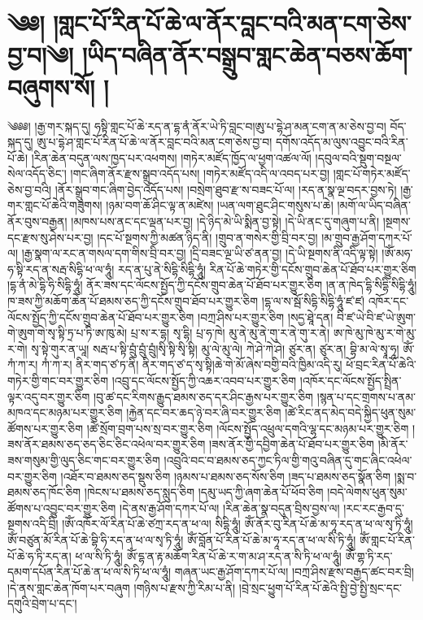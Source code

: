 \chapter{༄༅། །གླང་པོ་རིན་པོ་ཆེ་ལ་ནོར་བླང་བའི་མན་ངག་ཅེས་བྱ་བ།༄། །ཡིད་བཞིན་ནོར་བསྒྲུབ་གླང་ཆེན་བཅས་ཆོག་བཞུགས་སོ། །}༄༅༅། །རྒྱ་གར་སྐད་དུ། ཧསྟི་གླང་པོ་ཆེ་རད་ན་དྷ་ནཾ་ནོར་ཡེ་ཏི་བླང་བ།ཨུ་པ་དྷེ་ཤ་མན་ངག་ན་མ་ཅེས་བྱ་བ། བོད་སྐད་དུ། ཨུ་པ་དྷེ་ཤ་གླང་པོ་རིན་པོ་ཆེ་ལ་ནོར་བླང་བའི་མན་ངག་ཅེས་བྱ་བ། དགོས་འདོད་མ་ལུས་འབྱུང་བའི་རིན་པོ་ཆེ། །རིན་ཆེན་བདུན་ལས་ཁྱད་པར་འཕགས། །གཏེར་མཛོད་ཁྱོད་ལ་ཕྱག་འཚལ་ལོ། །དབུལ་བའི་སྡུག་བསྔལ་སེལ་འདོད་ཅིང་། །གང་ཞིག་ནོར་རྫས་སྒྲུབ་འདོད་པས། །གཏེར་མཛོད་འདི་ལ་འབད་པར་བྱ། །གླང་པོ་གཏེར་མཛོད་ཅེས་བྱ་བའི། །ནོར་སྒྲུབ་གང་ཞིག་བྱེད་འདོད་པས། །བསྲེག་ཐུབ་རྫ་ས་བཟང་པོ་ལ། །རད་ན་སྣ་ལྔ་བདར་བྱས་ཏེ། །རྒྱ་གར་གླང་པོ་ཆེའི་གཟུགས། །ཉམ་བག་ཆོ་ཤིང་ལྟ་ན་མཛེས། །ཡན་ལག་ཐུང་ཤིང་གསུས་པ་ཆེ། །མགོ་ལ་ཡིད་བཞིན་ནོར་བུས་བརྒྱན། །མཁས་པས་ནང་དང་ལྡན་པར་བྱ། །དེ་ཉིད་མེ་ཡི་སྨིན་བྱ་སྟེ། །དེ་ཡི་ནང་དུ་གཞུག་པ་ནི། །སྔགས་དང་རྫས་སུ་ཤེས་པར་བྱ། །དང་པོ་སྔགས་ཀྱི་མཚན་ཉིད་ནི། །གྲུབ་ན་གསེར་གྱི་བྲི་བར་བྱ། །མ་གྲུབ་རྒྱ་ཤོག་དཀར་པོ་ལ། །རྒྱ་སྣག་ལ་རང་ན་གསལ་དག་གིས་བྲི་བར་བྱ། །དྲི་བཟང་ལྔ་ཡི་ཙ་ནན་བྱ། །དེ་ཡི་སྔགས་ནི་འདི་ལྟ་སྟེ། །ཨོཾ་མཧ་ཧ་སྟི་རད་ན་སརྦ་སིདྷི་ཕ་ལ་ཧཱུཾ། རད་ན་པུ་ནེ་སིདྷི་སིདྷི་ཧཱུཾ། རིན་པོ་ཆེ་གཏེར་གྱི་དངོས་གྲུབ་ཆེན་པོ་ཐོབ་པར་གྱུར་ཅིག །དྷ་ནཾ་མེ་དྷི་ཧི་སིདྷི་ཧཱུཾ། ནོར་ཟས་དང་ལོངས་སྤྱོད་ཀྱི་དངོས་གྲུབ་ཆེན་པོ་ཐོབ་པར་གྱུར་ཅིག །ན་ན་ཁེད་དྷི་སིདྷི་སིདྷི་ཧཱུཾ། ཁ་ཟས་ཀྱི་མཆོག་ཆེན་པོ་ཐམས་ཅད་ཀྱི་དངོས་གྲུབ་ཐོབ་པར་གྱུར་ཅིག །དྷ་ལ་ས་སྦོ་སིདྷི་སིདྷི་ཧཱུཾ་ཛ་ཛ། འཁོར་དང་ལོངས་སྤྱོད་ཀྱི་དངོས་གྲུབ་ཆེན་པོ་ཐོབ་པར་གྱུར་ཅིག །བཀྲ་ཤིས་པར་གྱུར་ཅིག །སདྱ་ཐཱེ་དན། བི་ཛ་ཡེ་བི་ཛ་ཡེ་ཨུག་གེ་ཨུག་གེ་སྭ་སྟི་ཏྲ་པ་ཏི་ཨ་ཁུ་མེ། པྲ་ས་ར་དྷ། སྭ་དྷི། པྲ་ཧ་ཁེ། མུ་ནེ་མུ་ནེ་གུ་ར་ནེ་གུ་ར་ནེ། ཨ་ཁེ་མུ་ཁེ་མུ་ར་གེ་མུ་ར་གེ། སྭ་སྟེ་གུར་ན་ཡཱ། སརྦ་པ་སྟི་བྲུཾ་བྲུཾ་བྲུཾ།སྭི་སྟི་སྭི་སྟི། མུ་ལེ་མུ་ལེ། ཀེ་ཤེ་ཀེ་ཤེ། ཙུར་ན། ཙུར་ན། བྷི་མ་ལེ་སྭཱ་ཧཱ། ཨོཾ་ཀཾ་ཀ་ར། ཀཾ་ཀ་ར། ནིར་གད་ཙ་ཏ་ནི། ནིར་གད་ཙ་ད་སྭ་སྟི།ཆེ་གེ་མོ་ཞེས་བགྱི་བའི་ཁྱིམ་འདི་རུ། ཕོ་བྲང་རིན་པོ་ཆེའི་གཏེར་གྱི་གང་བར་གྱུར་ཅིག །འབྲུ་དང་ལོངས་སྤྱོད་ཀྱི་འཆར་འབབ་པར་གྱུར་ཅིག །འཁོར་དང་ལོངས་སྤྱོད་སྤྲིན་ལྟར་འདུ་བར་གྱུར་ཅིག །བུ་ཚ་དང་རིགས་རྒྱུད་ཐམས་ཅད་དར་ཤིང་རྒྱས་པར་གྱུར་ཅིག །སྙན་པ་དང་གྲགས་པ་ནམ་མཁའ་དང་མཉམ་པར་གྱུར་ཅིག །རྐྱེན་དང་བར་ཆད་ཉེ་བར་ཞི་བར་གྱུར་ཅིག །ཚེ་རིང་ནད་མེད་བདེ་སྐྱིད་ཕུན་སུམ་ཚོགས་པར་གྱུར་ཅིག །ཚེ་སྲོག་བྲག་པས་སྲ་བར་གྱུར་ཅིག །ལོངས་སྤྱོད་འཕྲུལ་དགའི་ལྷ་དང་མཉམ་པར་གྱུར་ཅིག །ཟས་ནོར་ཐམས་ཅད་ཅད་ཅིང་ཅིང་འཕེལ་བར་གྱུར་ཅིག །ཟས་ནོར་གྱི་དབྱིག་ཆེན་པོ་ཐོབ་པར་གྱུར་ཅིག །མི་ནོར་ཟས་གསུམ་གྱི་ལུད་ཅིང་གང་བར་གྱུར་ཅིག །འབྲུའི་བང་བ་ཐམས་ཅད་ཀྱང་ཏིལ་གྱི་གའུ་བཞིན་དུ་གང་ཞིང་འཕེལ་བར་གྱུར་ཅིག །འཐོར་བ་ཐམས་ཅད་སྡུས་ཅིག །ཉམས་པ་ཐམས་ཅད་སོས་ཅིག །ཟད་པ་ཐམས་ཅད་སྣོན་ཅིག །སྨ་བ་ཐམས་ཅད་ཁོང་ཅིག །ཁེངས་པ་ཐམས་ཅད་སླུད་ཅིག །དམུ་ཡད་ཀྱི་ཞག་ཆེན་པོ་ཕོབ་ཅིག །བདེ་ལེགས་ཕུན་སུམ་ཚོགས་པ་འབྱུང་བར་གྱུར་ཅིག །དེ་ནས་རྒྱ་ཤོག་དཀར་པོ་ལ། །རིན་ཆེན་སྣ་བདུན་བྲིས་བྱས་ལ། །རང་རང་རྒྱབ་དུ་སྔགས་འདི་བྲི། །ཨོཾ་འཁོར་ལོ་རིན་པོ་ཆེ་ཙཀྲ་རད་ན་ཕ་ལ། སིདྷི་ཧཱུཾ། ཨོཾ་ནོར་བུ་རིན་པོ་ཆེ་མ་ཧཱ་རད་ན་ཕ་ལ་སྭ་ཏི་ཧཱུཾ།ཨོཾ་བཙུན་མོ་རིན་པོ་ཆེ་བྷི་ཧི་རད་ན་ཕ་ལ་སྭ་ཏི་ཧཱུཾ། ཨོཾ་བློན་པོ་རིན་པོ་ཆེ་མ་ཧཱ་རད་ན་ཕ་ལ་སི་ཏི་ཧཱུཾ། ཨོཾ་གླང་པོ་རིན་པོ་ཆེ་ཧ་ཏི་རད་ན། ཕ་ལ་སི་ཏི་ཧཱུཾ། ཨོཾ་དྷ་ན་རྟ་མཆོག་རིན་པོ་ཆེ་ར་ག་མ་ཤ་རད་ན་སི་ཏི་ཕ་ལ་ཧཱུཾ། ཨོཾ་གྷ་ཏི་རད་དམག་དཔོན་རིན་པོ་ཆེ་ན་ཕ་ལ་སི་ཏི་ཕ་ལ་ཧཱུཾ། གཞན་ཡང་རྒྱ་ཤོག་དཀར་པོ་ལ། །བཀྲ་ཤིས་རྫས་བརྒྱད་ཚང་བར་བྲི། །དེ་ནས་གླང་ཆེན་ཁོག་པར་བཞུག །གཉིས་པ་རྫས་ཀྱི་རིམ་པ་ནི། །བྲེ་སྲང་ཕྱུག་པོ་རིན་པོ་ཆེའི་སྤྱི་བྱེ་སྤྱི་སྲང་དང་དགུའི་བྲེག་པ་དང་། 